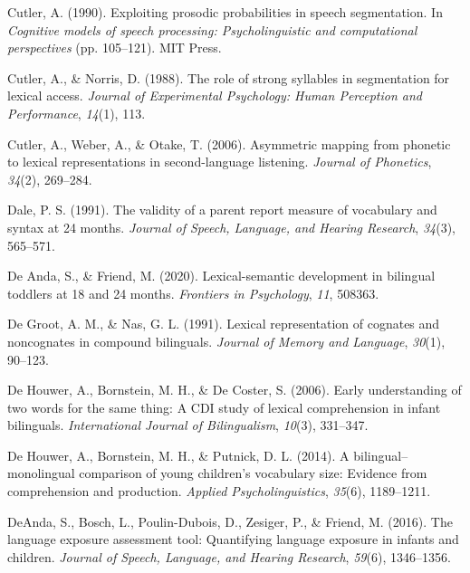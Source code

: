 \documentclass[
  12pt,
  b5paperpaper,
  twoside]{scrreprt}
\newlength{\cslhangindent}
\newlength{\cslentryspacingunit} %
\newenvironment{CSLReferences}[2] %
 {%
  \setlength{\parindent}{0pt}
  \ifodd #1
  \let\oldpar\par
  \def\par{\hangindent=\cslhangindent\oldpar}
  \fi
  \setlength{\parskip}{#2\cslentryspacingunit}
 }%
 {}
\begin{document}
\begin{CSLReferences}{1}{0}
\leavevmode{}%
Cutler, A. (1990). Exploiting prosodic probabilities in speech
segmentation. In \emph{Cognitive models of speech processing:
Psycholinguistic and computational perspectives} (pp. 105--121). MIT
Press.

\leavevmode{}%
Cutler, A., \& Norris, D. (1988). The role of strong syllables in
segmentation for lexical access. \emph{Journal of Experimental
Psychology: Human Perception and Performance}, \emph{14}(1), 113.

\leavevmode{}%
Cutler, A., Weber, A., \& Otake, T. (2006). Asymmetric mapping from
phonetic to lexical representations in second-language listening.
\emph{Journal of Phonetics}, \emph{34}(2), 269--284.

\leavevmode{}%
Dale, P. S. (1991). The validity of a parent report measure of
vocabulary and syntax at 24 months. \emph{Journal of Speech, Language,
and Hearing Research}, \emph{34}(3), 565--571.

\leavevmode{}%
De Anda, S., \& Friend, M. (2020). Lexical-semantic development in
bilingual toddlers at 18 and 24 months. \emph{Frontiers in Psychology},
\emph{11}, 508363.

\leavevmode{}%
De Groot, A. M., \& Nas, G. L. (1991). Lexical representation of
cognates and noncognates in compound bilinguals. \emph{Journal of Memory
and Language}, \emph{30}(1), 90--123.

\leavevmode{}%
De Houwer, A., Bornstein, M. H., \& De Coster, S. (2006). Early
understanding of two words for the same thing: A CDI study of lexical
comprehension in infant bilinguals. \emph{International Journal of
Bilingualism}, \emph{10}(3), 331--347.

\leavevmode{}%
De Houwer, A., Bornstein, M. H., \& Putnick, D. L. (2014). A
bilingual--monolingual comparison of young children's vocabulary size:
Evidence from comprehension and production. \emph{Applied
Psycholinguistics}, \emph{35}(6), 1189--1211.

\leavevmode{}%
DeAnda, S., Bosch, L., Poulin-Dubois, D., Zesiger, P., \& Friend, M.
(2016). The language exposure assessment tool: Quantifying language
exposure in infants and children. \emph{Journal of Speech, Language, and
Hearing Research}, \emph{59}(6), 1346--1356.


\end{CSLReferences}
\end{document}

